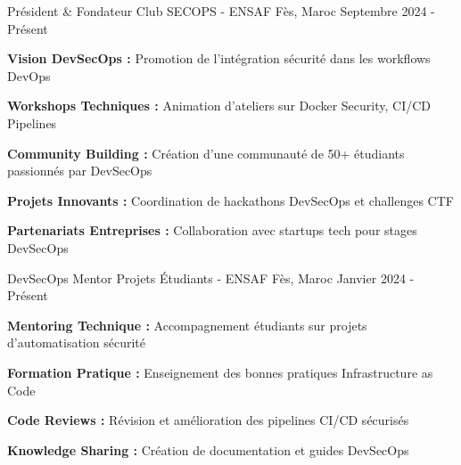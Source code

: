 
\begin{cventries}


    \cventry
    {Président \& Fondateur} %
    {Club SECOPS - ENSAF} %
    {Fès, Maroc} %
    {Septembre 2024 - Présent} %
    {
        \begin{cvitems} %
            \item {\textbf{Vision DevSecOps :} Promotion de l'intégration sécurité dans les workflows DevOps}
            \item {\textbf{Workshops Techniques :} Animation d'ateliers sur Docker Security, CI/CD Pipelines}
            \item {\textbf{Community Building :} Création d'une communauté de 50+ étudiants passionnés par DevSecOps}
            \item {\textbf{Projets Innovants :} Coordination de hackathons DevSecOps et challenges CTF}
            \item {\textbf{Partenariats Entreprises :} Collaboration avec startups tech pour stages DevSecOps}
        \end{cvitems}
    }

    \cventry
    {DevSecOps Mentor} %
    {Projets Étudiants - ENSAF} %
    {Fès, Maroc} %
    {Janvier 2024 - Présent} %
    {
        \begin{cvitems} %
            \item {\textbf{Mentoring Technique :} Accompagnement étudiants sur projets d'automatisation sécurité}
            \item {\textbf{Formation Pratique :} Enseignement des bonnes pratiques Infrastructure as Code}
            \item {\textbf{Code Reviews :} Révision et amélioration des pipelines CI/CD sécurisés}
            \item {\textbf{Knowledge Sharing :} Création de documentation et guides DevSecOps}
        \end{cvitems}
    }


\end{cventries}
